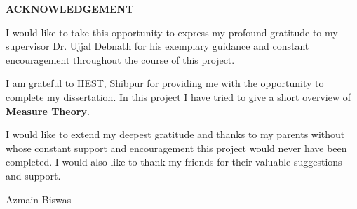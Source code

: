 \begin{center}
    \LARGE{\textbf{ACKNOWLEDGEMENT}}
\end{center}
\begin{flushleft}
    \large
    I would like to take this opportunity to express my profound gratitude to my supervisor Dr. Ujjal Debnath 
    for his exemplary guidance and constant encouragement throughout the course of this project. 

    \vspace{5mm}
    I am grateful to IIEST, Shibpur for providing me with the opportunity to complete my dissertation. 
    In this project I have tried to give a short overview of \textbf{Measure Theory}.

    \vspace{5mm}
    I would like to extend my deepest gratitude and thanks to my parents without whose constant support and encouragement this project would never have been completed. 
    I would also like to thank my friends for their valuable suggestions and support.
\end{flushleft}

\begin{flushright}
    \large
    Azmain Biswas
\end{flushright}
